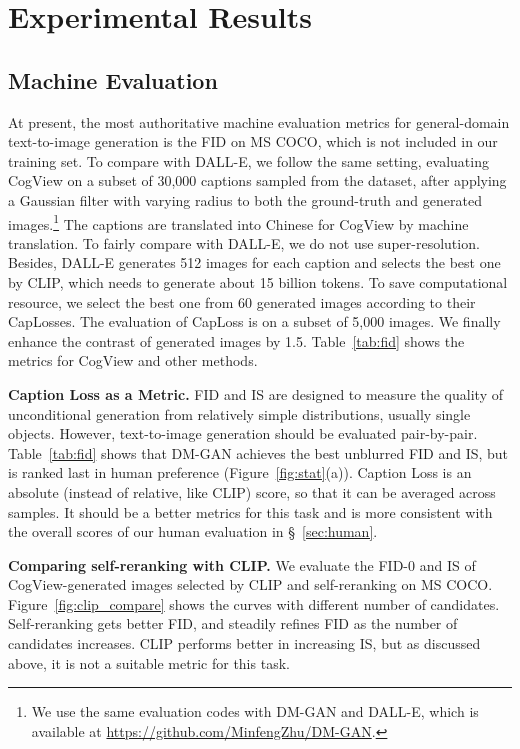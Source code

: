\section{Experimental Results}

\subsection{Machine Evaluation}

At present, the most authoritative machine evaluation metrics for general-domain text-to-image generation is the FID on MS COCO, which is not included in our training set. To compare with DALL-E, we follow the same setting, evaluating CogView on a subset of 30,000 captions sampled from the dataset, after applying a Gaussian filter with varying radius to both the ground-truth and generated images.\footnote{We use the same evaluation codes with DM-GAN and DALL-E, which is available at \url{https://github.com/MinfengZhu/DM-GAN}.} The captions are translated into Chinese for CogView by machine translation. To fairly compare with DALL-E, we do not use super-resolution. Besides, DALL-E generates 512 images for each caption and selects the best one by CLIP, which needs to generate about 15 billion tokens. To save computational resource, we select the best one from 60 generated images according to their CapLosses. The evaluation of CapLoss is on a subset of 5,000 images. We finally enhance the contrast of generated images by 1.5. Table~\ref{tab:fid} shows the metrics for CogView and other methods.

\textbf{Caption Loss as a Metric.} FID and IS are designed to measure the quality of unconditional generation from relatively simple distributions, usually single objects. However, text-to-image generation should be evaluated pair-by-pair. Table~\ref{tab:fid} shows that DM-GAN achieves the best unblurred FID and IS, but is ranked last in human preference (Figure~\ref{fig:stat}(a)). Caption Loss is an absolute (instead of relative, like CLIP) score, so that it can be averaged across samples. It should be a better metrics for this task and is more consistent with the overall scores of our human evaluation in \S~\ref{sec:human}. 

\textbf{Comparing self-reranking with CLIP.} We evaluate the FID-0 and IS of CogView-generated images selected by CLIP and self-reranking on MS COCO. Figure~\ref{fig:clip_compare} shows the curves with different number of candidates. Self-reranking gets better FID, and steadily refines FID as the number of candidates increases. CLIP performs better in increasing IS, but as discussed above, it is not a suitable metric for this task.


